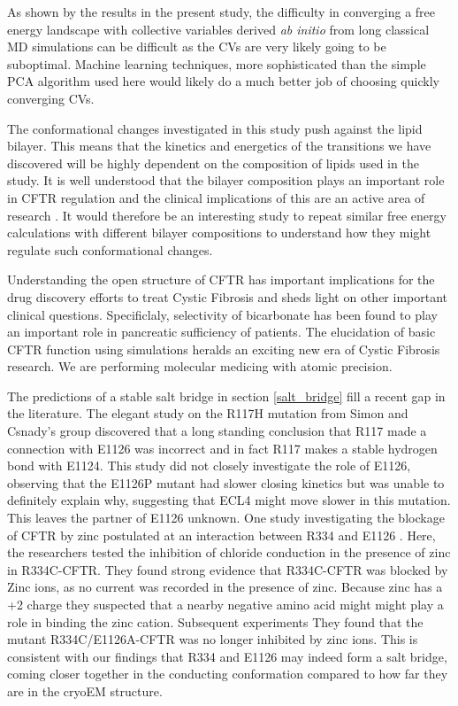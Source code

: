 As shown by the results in the present study, the difficulty in converging a free energy landscape with collective variables derived \textit {ab initio} from long classical MD simulations can be difficult as the CVs are very likely going to be suboptimal. Machine learning techniques, more sophisticated than the simple PCA algorithm used here would likely do a much better job of choosing quickly converging CVs. 

The conformational changes investigated in this study push against the lipid bilayer. This means that the kinetics and energetics of the transitions we have discovered will be highly dependent on the composition of lipids used in the study. It is well understood that the bilayer composition plays an important role in CFTR regulation and the clinical implications of this are an active area of research \cite{cui2020, cottrill2020}. It would therefore be an interesting study to repeat similar free energy calculations with different bilayer compositions to understand how they might regulate such conformational changes.

Understanding the open structure of CFTR has important implications for the drug discovery efforts to treat Cystic Fibrosis and sheds light on other important clinical questions. Specificlaly, selectivity of bicarbonate has been found to play an important role in pancreatic sufficiency of patients. The elucidation of basic CFTR function using simulations heralds an exciting new era of Cystic Fibrosis research. We are performing molecular medicing with atomic precision. 

The predictions of a stable salt bridge in section \ref{salt_bridge} fill a recent gap in the literature. The elegant study on the R117H mutation from Simon and Csnady's group \cite{simon2021}  discovered that a long standing conclusion that R117 made a connection with E1126 was incorrect and in fact R117 makes a stable hydrogen bond with E1124. This study did not closely investigate the role of E1126, observing that the E1126P mutant had slower closing kinetics but was unable to definitely explain why, suggesting that ECL4 might move slower in this mutation. This leaves the partner of E1126 unknown. One study investigating the blockage of CFTR by zinc postulated at an interaction between R334 and E1126 \cite{wang2016}. Here, the researchers tested the inhibition of chloride conduction in the presence of zinc in R334C-CFTR. They found strong evidence that R334C-CFTR was blocked by Zinc ions, as no current was recorded in the presence of zinc. Because zinc has a +2 charge they suspected that a nearby negative amino acid might might play a role in binding the zinc cation. Subsequent experiments They found that the mutant R334C/E1126A-CFTR was no longer inhibited by zinc ions. This is consistent with our findings that R334 and E1126 may indeed form a salt bridge, coming closer together in the conducting conformation compared to how far they are in the cryoEM structure.  


